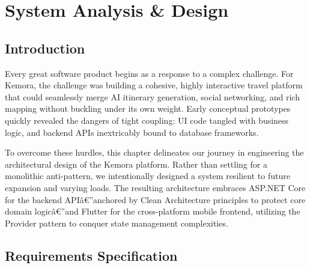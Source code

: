 \chapter{System Analysis \& Design}

\section{Introduction}
Every great software product begins as a response to a complex challenge. For Kemora, the challenge was building a cohesive, highly interactive travel platform that could seamlessly merge AI itinerary generation, social networking, and rich mapping without buckling under its own weight. Early conceptual prototypes quickly revealed the dangers of tight coupling: UI code tangled with business logic, and backend APIs inextricably bound to database frameworks. 

To overcome these hurdles, this chapter delineates our journey in engineering the architectural design of the Kemora platform. Rather than settling for a monolithic anti-pattern, we intentionally designed a system resilient to future expansion and varying loads. The resulting architecture embraces ASP.NET Core \cite{aspnetcore} for the backend APIâ€”anchored by Clean Architecture \cite{cleanarchitecture} principles to protect core domain logicâ€”and Flutter \cite{flutter} for the cross-platform mobile frontend, utilizing the Provider pattern \cite{providerpattern} to conquer state management complexities.

\section{Requirements Specification}

